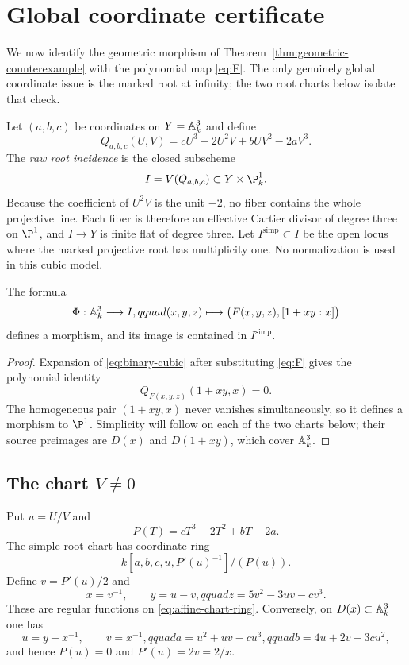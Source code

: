 \section{Global coordinate certificate}\label{sec:cubic-incidence}

We now identify the geometric morphism of
Theorem~\ref{thm:geometric-counterexample} with the polynomial map
\eqref{eq:F}.  The only genuinely global coordinate issue is the marked root
at infinity; the two root charts below isolate that check.

Let $(a,b,c)$ be coordinates on $Y=\mathbb A^3_k$ and define
\begin{equation}\label{eq:binary-cubic}
 Q_{a,b,c}(U,V)=cU^3-2U^2V+bUV^2-2aV^3.
\end{equation}
The \emph{raw root incidence} is the closed subscheme
\[
 I=V(Q_{a,b,c})\subset Y\times\P^1_k.
\]
Because the coefficient of $U^2V$ is the unit $-2$, no fiber contains the
whole projective line.  Each fiber is therefore an effective Cartier divisor
of degree three on $\P^1$, and $I\to Y$ is finite flat of degree three.  Let
$I^{\mathrm{simp}}\subset I$ be the open locus where the marked projective
root has multiplicity one.  No normalization is used in this cubic model.

\begin{proposition}\label{prop:cubic-marking}
The formula
\[
 \Phi:\mathbb A^3_k\longrightarrow I,qquad
 (x,y,z)\longmapsto\bigl(F(x,y,z),[1+xy:x]\bigr)
\]
defines a morphism, and its image is contained in $I^{\mathrm{simp}}$.
\end{proposition}

\begin{proof}
Expansion of \eqref{eq:binary-cubic} after substituting \eqref{eq:F} gives
the polynomial identity
\[
 Q_{F(x,y,z)}(1+xy,x)=0.
\]
The homogeneous pair $(1+xy,x)$ never vanishes simultaneously, so it defines
a morphism to $\P^1$.  Simplicity will follow on each of the two charts below;
their source preimages are $D(x)$ and $D(1+xy)$, which cover $\mathbb A^3_k$.
\end{proof}

\subsection{The chart \texorpdfstring{$V\ne0$}{V nonzero}}

Put $u=U/V$ and
\[
 P(T)=cT^3-2T^2+bT-2a.
\]
The simple-root chart has coordinate ring
\begin{equation}\label{eq:affine-chart-ring}
 k[a,b,c,u,P'(u)^{-1}]/(P(u)).
\end{equation}
Define $v=P'(u)/2$ and
\begin{equation}\label{eq:affine-inverse}
 x=v^{-1},\qquad y=u-v,qquad
 z=5v^2-3uv-cv^3.
\end{equation}
These are regular functions on \eqref{eq:affine-chart-ring}.  Conversely, on
$D(x)\subset\mathbb A^3_k$ one has
\begin{equation}\label{eq:affine-forward}
 u=y+x^{-1},\qquad v=x^{-1},qquad
 a=u^2+uv-cu^3,qquad b=4u+2v-3cu^2,
\end{equation}
and hence $P(u)=0$ and $P'(u)=2v=2/x$.

